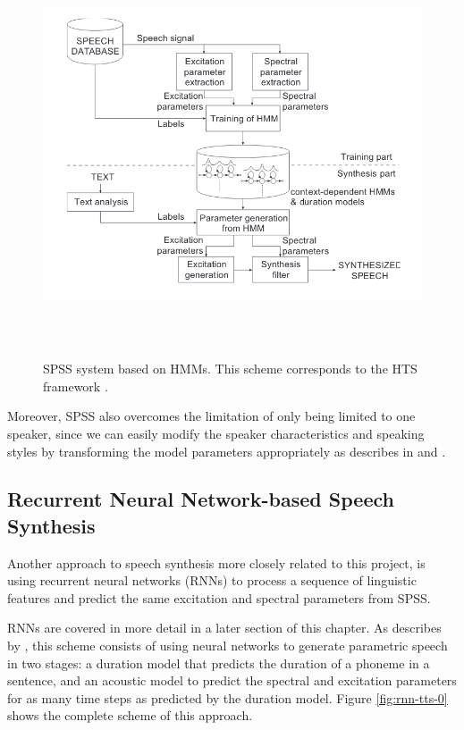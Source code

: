 \begin{figure}
    \centering
    \includegraphics[height=12cm]{figures/hts}
    \caption{SPSS system based on HMMs. This scheme corresponds to the HTS framework \cite{zen2007hmm}.}
    \label{fig:hts}
\end{figure}

Moreover, SPSS also overcomes the limitation of only being limited to one speaker, since we can easily modify the speaker characteristics and speaking styles by transforming the model parameters appropriately as describes in \cite{zen2007hmm} and \cite{pascual2006deep}.


\subsection{Recurrent Neural Network-based Speech Synthesis} \label{sec:rnn-tts}

Another approach to speech synthesis more closely related to this project, is using recurrent neural networks (RNNs) to process a sequence of linguistic features and predict the same excitation and spectral parameters from SPSS.

RNNs are covered in more detail in a later section of this chapter. As describes by \cite{chen1998rnn}, this scheme consists of using neural networks to generate parametric speech in two stages: a duration model that predicts the duration of a phoneme in a sentence, and an acoustic model to predict the spectral and excitation parameters for as many time steps as predicted by the duration model. Figure \ref{fig:rnn-tts-0} shows the complete scheme of this approach.

